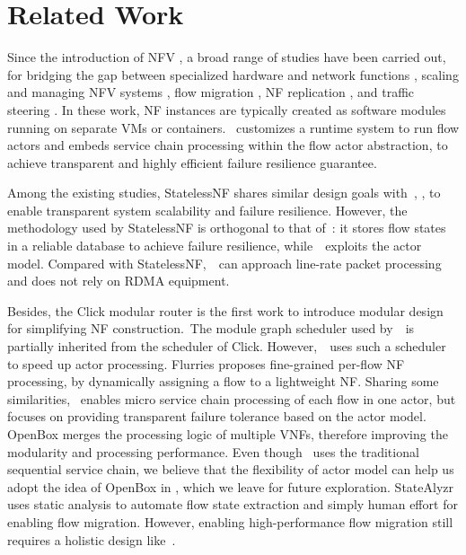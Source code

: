 \section{Related Work}
\label{sec:relatedwork}

Since the introduction of NFV \cite{nfv-white-paper}, a broad range of studies have been carried out, for bridging the gap between specialized hardware and network functions \cite{hwang2015netvm, Han:EECS-2015-155, martins2014clickos, 199352}, scaling and managing NFV systems \cite{gember2012stratos, palkar2015e2}, flow migration \cite{rajagopalan2013split, khalid2016paving, gember2015opennf}, NF replication \cite{rajagopalan2013pico, sherry2015rollback}, and traffic steering \cite{simplifying}. In these work, NF instances are typically created as software modules running on separate VMs or containers. \nfactor~customizes a runtime system to run flow actors and embeds service chain processing within the flow actor abstraction, to achieve transparent and highly efficient failure resilience guarantee.


Among the existing studies, StatelessNF \cite{201545} shares similar design goals with~\nfactor, \ie, to enable transparent system scalability and failure resilience. However, the methodology used by StatelessNF is orthogonal to that of~\nfactor: it stores flow states in a reliable database \cite{ongaro2011fast} to achieve failure resilience, while~\nfactor~exploits the actor model. Compared with StatelessNF,~\nfactor~can approach line-rate packet processing and does not rely on RDMA equipment.

Besides, the Click modular router \cite{kohler2000click} is the first work to introduce modular design for simplifying NF construction.~The module graph scheduler used by~\nfactor~is partially inherited from the scheduler of Click. However,~\nfactor~uses such a scheduler to speed up actor processing. Flurries \cite{zhang2016flurries} proposes fine-grained per-flow NF processing, by dynamically assigning a flow to a lightweight NF. Sharing some similarities, \nfactor~enables micro service chain processing of each flow in one actor, but focuses on providing transparent failure tolerance based on the actor model. OpenBox \cite{OpenBox} merges the processing logic of multiple VNFs, therefore improving the modularity and processing performance. Even though \nfactor~uses the traditional sequential service chain, we believe that the flexibility of actor model can help us adopt the idea of OpenBox in \nfactor, which we leave for future exploration. StateAlyzr \cite{khalid2016paving} uses static analysis to automate flow state extraction and simply human effort for enabling flow migration. However, enabling high-performance flow migration still requires a holistic design like~\nfactor.

